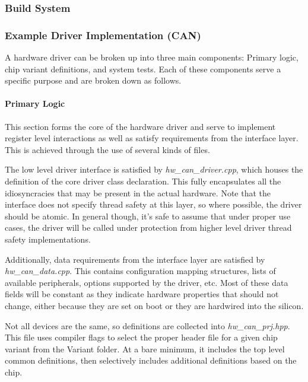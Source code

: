 \documentclass[10pt, letterpaper, tikz]{article}
\begin{document}
  \subsubsection{Build System}

  \subsubsection{Example Driver Implementation (CAN)}

  \par
    A hardware driver can be broken up into three main components: Primary logic, chip variant definitions, and system tests.
    Each of these components serve a specific purpose and are broken down as follows.

    \paragraph{Primary Logic}\mbox{}\newline
      This section forms the core of the hardware driver and serve to implement register level interactions
      as well as satisfy requirements from the interface layer. This is achieved through the use of several
      kinds of files. \newline

      The low level driver interface is satisfied by \emph{hw\_can\_driver.cpp}, which houses the definition
      of the core driver class declaration. This fully encapsulates all the idiosyncracies that may be present
      in the actual hardware. Note that the interface does not specify thread safety at this layer, so where
      possible, the driver should be atomic. In general though, it's safe to assume that under proper use
      cases, the driver will be called under protection from higher level driver thread safety
      implementations.\newline

      Additionally, data requirements from the interface layer are satisfied by \emph{hw\_can\_data.cpp}. This
      contains configuration mapping structures, lists of available peripherals, options supported by the driver,
      etc. Most of these data fields will be constant as they indicate hardware properties that should not
      change, either because they are set on boot or they are hardwired into the silicon.\newline

      Not all devices are the same, so definitions are collected into \emph{hw\_can\_prj.hpp}. This file uses
      compiler flags to select the proper header file for a given chip variant from the Variant folder. At a
      bare minimum, it includes the top level common definitions, then selectively includes additional
      definitions based on the chip.\newline
\end{document}
